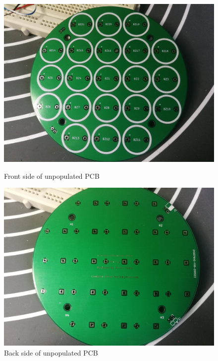 \begin{figure}[ht!]
\centering

    \begin{minipage}{0.49\textwidth}
    \centering
    \includegraphics[width= \textwidth]{Figures/Implementation/TransducerArray/pcbfront.jpg}
    \caption{Front side of unpopulated PCB}
    \label{fig:pcbfrontunpop}
    \end{minipage}\hfill
    \begin{minipage}{0.49\textwidth}
    \centering
    \includegraphics[width= \textwidth]{Figures/Implementation/TransducerArray/pcbback.jpg}
    \caption{Back side of unpopulated PCB}
    \label{fig:pcbbackunpop}
    \end{minipage}
    
\end{figure}


